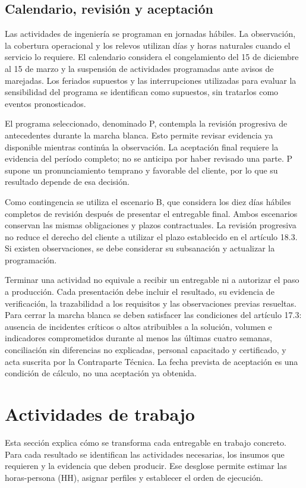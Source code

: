 \subsection{Calendario, revisión y aceptación}
Las actividades de ingeniería se programan en jornadas hábiles. La observación, la cobertura operacional y los relevos utilizan días y horas naturales cuando el servicio lo requiere. El calendario considera el congelamiento del 15 de diciembre al 15 de marzo y la suspensión de actividades programadas ante avisos de marejadas. Los feriados supuestos y las interrupciones utilizadas para evaluar la sensibilidad del programa se identifican como supuestos, sin tratarlos como eventos pronosticados.

El programa seleccionado, denominado P, contempla la revisión progresiva de antecedentes durante la marcha blanca. Esto permite revisar evidencia ya disponible mientras continúa la observación. La aceptación final requiere la evidencia del período completo; no se anticipa por haber revisado una parte. P supone un pronunciamiento temprano y favorable del cliente, por lo que su resultado depende de esa decisión.

Como contingencia se utiliza el escenario B, que considera los diez días hábiles completos de revisión después de presentar el entregable final. Ambos escenarios conservan las mismas obligaciones y plazos contractuales. La revisión progresiva no reduce el derecho del cliente a utilizar el plazo establecido en el artículo 18.3. Si existen observaciones, se debe considerar su subsanación y actualizar la programación.

Terminar una actividad no equivale a recibir un entregable ni a autorizar el paso a producción. Cada presentación debe incluir el resultado, su evidencia de verificación, la trazabilidad a los requisitos y las observaciones previas resueltas. Para cerrar la marcha blanca se deben satisfacer las condiciones del artículo 17.3: ausencia de incidentes críticos o altos atribuibles a la solución, volumen e indicadores comprometidos durante al menos las últimas cuatro semanas, conciliación sin diferencias no explicadas, personal capacitado y certificado, y acta suscrita por la Contraparte Técnica. La fecha prevista de aceptación es una condición de cálculo, no una aceptación ya obtenida.




\section{Actividades de trabajo}
\label{sec:t15-actividades}
Esta sección explica cómo se transforma cada entregable en trabajo concreto. Para cada resultado se identifican las actividades necesarias, los insumos que requieren y la evidencia que deben producir. Ese desglose permite estimar las horas-persona (HH), asignar perfiles y establecer el orden de ejecución.

